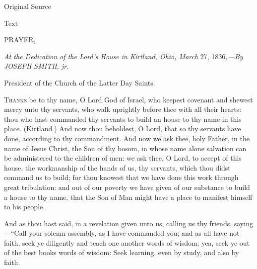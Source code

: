 				\begin{description}
					\item[Original Source]
				\end{description}
				
				
				\begin{description}
					\item[Text]
				\end{description}
				
					\begin{tightcenter}
					PRAYER,

					\textit{At the Dedication of the Lord's House in Kirtland, Ohio, March} 27, 1836\textit{,---By JOSEPH SMITH, jr.}

					President of the Church of the Latter Day Saints.
					\end{tightcenter}

					\textsc{Thanks} be to thy name, O Lord God of Israel, who keepest covenant and shewest mercy unto thy servants, who walk uprightly before thee with all their hearts: thou who hast commanded thy servants to build an house to thy name in this place. (Kirtland.) And now thou beholdest, O Lord, that so thy servants have done, according to thy commandment. And now we ask thee, holy Father, in the name of Jesus Christ, the Son of thy bosom, in whose name alone salvation can be administered to the children of men: we ask thee, O Lord, to accept of this house, the workmanship of the hands of us, thy servants, which thou didst command us to build; for thou knowest that we have done this work through great tribulation: and out of our poverty we have given of our substance to build a house to thy name, that the Son of Man might have a place to manifest himself to his people.

					And as thou hast said, in a revelation given unto us, calling us thy friends, saying---``Call your solemn assembly, as I have commanded you; and as all have not faith, seek ye diligently and teach one another words of wisdom; yea, seek ye out of the best books words of wisdom: Seek learning, even by study, and also by faith.

